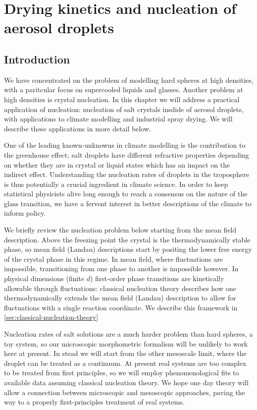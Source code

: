 \documentclass[11pt,twoside]{report}
\begin{document}
\chapter{Drying kinetics and nucleation of aerosol droplets}

\section{Introduction}

We have concentrated on the problem of modelling hard spheres at high densities, with a paritcular focus on supercooled liquids and glasses.
Another problem at high densities is crystal nucleation.
In this chapter we will address a practical application of nucleation: nucleation of salt crystals insdide of aerosol droplets, with applications to climate modelling and industrial spray drying.
We will describe these applications in more detail below.

One of the leading known-unknowns in climate modelling is the contribution to the greenhouse effect; salt droplets have different refractive properties depending on whether they are in crystal or liquid states which has an impact on the indirect effect.
Understanding the nucleation rates of droplets in the troposphere is thus potentially a crucial ingredient in climate science.
In order to keep statistical physicists alive long enough to reach a consensus on the nature of the glass transition, we have a fervent interest in better descriptions of the climate to inform policy.

We briefly review the nucleation problem below starting from the mean field description.
Above the freezing point the crystal is the thermodynamically stable phase, so mean field (Landau) descriptions start by positing the lower free energy of the crystal phase in this regime.
In mean field, where fluctuations are impossible, transitioning from one phase to another is impossible however.
In physical dimensions (finite $d$) first-order phase transitions are kinetically allowable through fluctuations: classical nucleation theory describes how one thermodynamically extends the mean field (Landau) description to allow for fluctuations with a single reaction coordinate.
We describe this framework in \ref{sec:classical-nucleation-theory}

Nucleation rates of salt solutions are a much harder problem than hard spheres, a toy system, so our microscopic morphometric formalism will be unlikely to work here at present.
In stead we will start from the other mesoscale limit, where the droplet can be treated as a continuum.
At present real systems are too complex to be treated from first principles, so we will employ phenomenological fits to available data assuming classical nucleation theory.
We hope one day theory will allow a connection between microscopic and mesoscopic approaches, paving the way to a properly first-principles treatment of real systems.
\end{document}
